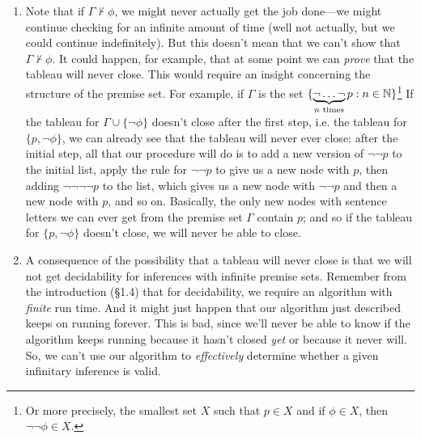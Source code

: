 \begin{enumerate}[\thesection.1]
		\item Note that if $\Gamma\nvdash \phi$, we might never actually get the job done---we might continue checking for an infinite amount of time (well not actually, but we could continue indefinitely). But this doesn't mean that we can't show that $\Gamma\nvdash\phi$. It could happen, for example, that at some point we can \emph{prove} that the tableau will never close. This would require an insight concerning the structure of the premise set. For example, if $\Gamma$ is the set $\{\underbrace{\neg \mathellipsis\neg}_{n\text{ times}}p: n\in\mathbb{N}\}$\footnote{Or more precisely, the smallest set $X$ such that $p\in X$ and if $\phi\in X$, then $\neg\neg\phi\in X$.} If the tableau for $\Gamma\cup\{\neg\phi\}$ doesn't close after the first step, i.e. the tableau for $\{p,\neg\phi\}$, we can already see that the tableau will never ever close: after the initial step, all that our procedure will do is to add a new version of $\neg\neg p$ to the initial list, apply the rule for $\neg\neg p$ to give us a new node with $p$, then adding $\neg\neg \neg\neg p$ to the list, which gives us a new node with $\neg\neg p$ and then a new node with $p$, and so on. Basically, the only new nodes with sentence letters we can ever get from the premise set $\Gamma$ contain $p$; and so if the tableau for $\{p,\neg\phi\}$ doesn't close, we will never be able to close.
		
		\item A consequence of the possibility that a tableau will never close is that we will not get decidability for inferences with infinite premise sets. Remember from the introduction (\S1.4) that for decidability, we require an algorithm with \emph{finite} run time. And it might just happen that our algorithm just described keeps on running forever. This is bad, since we'll never be able to know if the algorithm keeps running because it hasn't closed \emph{yet} or because it never will. So, we can't use our algorithm to \emph{effectively} determine whether a given infinitary inference is valid. 
	

\end{enumerate}
